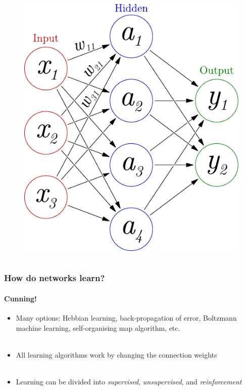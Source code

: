 \documentclass{beamer}
\newcommand{\figheight}{0.72\textheight}
\begin{document}
\begin{frame}
\begin{columns}[T]
\begin{column}{.55\textwidth}
\begin{figure}
\begin{flushleft}
	\includegraphics[height = \figheight]{./fig/3-layer_maths.pdf}
	\vspace{1cm}
	\end{flushleft}
	\end{figure}
    \end{column}
  \end{columns}
\end{frame}

\begin{frame}
\frametitle{How do networks learn?}
\framesubtitle{Cunning!}
\begin{itemize}
\item<1-> Many options: Hebbian learning, back-propagation of error, Boltzmann machine learning, self-organising map algorithm, etc. \\ \

\item<2-> All learning algorithms work by changing the connection weights \\ \

\item<3-> Learning can be divided into \emph{supervised}, \emph{unsupervised}, and \emph{reinforcement} \\ \ \end{itemize}
\end{frame}
\end{document}
